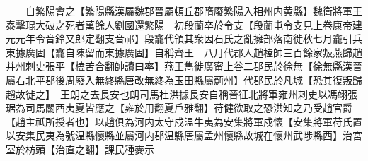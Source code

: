 　　自繁陽會之【繁陽縣漢屬魏郡晉屬頓丘郡隋廢繁陽入相州内黄縣】魏衛將軍王泰擊琨大破之死者萬餘人劉國還繁陽　初段蘭卒於令支【段蘭屯令支見上卷康帝建元元年令音鈴又郎定翻支音祁】段龕代領其衆因石氏之亂擁部落南徙秋七月龕引兵東據廣固【龕自陳留而東據廣固】自稱齊王　八月代郡人趙榼帥三百餘家叛燕歸趙并州刺史張平【榼苦合翻帥讀曰率】燕王雋徙廣甯上谷二郡民於徐無【徐無縣漢晉屬右北平郡後周廢入無終縣唐改無終為玉田縣屬薊州】代郡民於凡城【恐其復叛歸趙故徙之】　王朗之去長安也朗司馬杜洪據長安自稱晉征北將軍雍州刺史以馮翊張琚為司馬關西夷夏皆應之【雍於用翻夏戶雅翻】苻健欲取之恐洪知之乃受趙官爵【趙主祗所授者也】以趙俱為河内太守戍温牛夷為安集將軍戍懷【安集將軍苻氏置以安集民夷為號温縣懷縣並屬河内郡温縣唐屬孟州懷縣故城在懷州武陟縣西】治宮室於枋頭【治直之翻】課民種麥示
